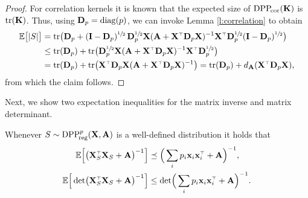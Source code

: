 \documentclass[11pt]{article}
\begin{document}
\begin{proof}
For correlation kernels it is known that the expected size of ${{\mathrm{DPP}}_{\!\mathrm{cor}}}(\mathbf K)$
is $\mathrm{tr}(\mathbf K)$. Thus, using $\mathbf D_p=\operatorname*{\mathop{\mathrm{diag}}}(p)$, we can invoke Lemma \ref{l:correlation} to obtain
\begin{align*}
  \E\big[|S|\big]
  &= \tr\big(\D_p +
  (\I-\D_p)^{\sfrac12}\,\D_p^{\sfrac12}\X(\A+\X^\top\D_p\X)^{-1}
                    \X^\top\D_p^{\sfrac12}(\I-\D_p)^{\sfrac12}\big)
  \\ &\leq \tr(\D_p) +\tr\big(\D_p^{\sfrac12}
       \X(\A+\X^\top\D_p\X)^{-1}\X^\top\D_p^{\sfrac12}\big)
\\ &=\tr(\D_p) +\tr\big(\X^\top\D_p\X (\A+\X^\top\D_p\X)^{-1}\big) =
     \tr(\D_p) + d_{\A}(\X^\top\D_p\X),
\end{align*}
from which the claim follows.
\end{proof}
Next, we show two expectation inequalities for the matrix inverse and
matrix determinant.
\begin{lemma}
Whenever $S\sim {{\mathrm{DPP}}_{\!\mathrm{reg}}^{p}}(\mathbf X,\mathbf A)$ is a well-defined distribution it holds that
\begin{align}
  \E\Big[\big(\X_S^\top\X_S+\A\big)^{-1}\Big]
  &\preceq \Big(
    \sum_ip_i\x_i\x_i^\top +\A \Big)^{-1},\label{eq:sqinv2}
  \\
\E\Big[\det\!\big(\X_S^\top\X_S+\A\big)^{-1}\Big]
  &\leq\det\!\Big(
    \sum_ip_i\x_i\x_i^\top +\A \Big)^{-1}.\label{eq:det2}
\end{align}
\end{lemma}
\end{document}
